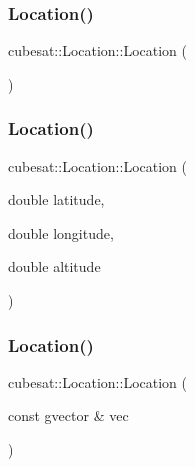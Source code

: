\subsubsection{\texorpdfstring{Location()}{Location()}\hspace{0.1cm}{\footnotesize\ttfamily [1/3]}}
{\footnotesize\ttfamily cubesat\+::\+Location\+::\+Location (\begin{DoxyParamCaption}{ }\end{DoxyParamCaption})\hspace{0.3cm}{\ttfamily [inline]}}

\mbox{\label{structcubesat_1_1Location_a5bb8201f3d6b276e19b4767fd9bfc7dd}} 
\subsubsection{\texorpdfstring{Location()}{Location()}\hspace{0.1cm}{\footnotesize\ttfamily [2/3]}}
{\footnotesize\ttfamily cubesat\+::\+Location\+::\+Location (\begin{DoxyParamCaption}\item[{double}]{latitude,  }\item[{double}]{longitude,  }\item[{double}]{altitude }\end{DoxyParamCaption})\hspace{0.3cm}{\ttfamily [inline]}}

\mbox{\label{structcubesat_1_1Location_ac6e05f08da64e8dad865013bcbc27223}} 
\subsubsection{\texorpdfstring{Location()}{Location()}\hspace{0.1cm}{\footnotesize\ttfamily [3/3]}}
{\footnotesize\ttfamily cubesat\+::\+Location\+::\+Location (\begin{DoxyParamCaption}\item[{const gvector \&}]{vec }\end{DoxyParamCaption})\hspace{0.3cm}{\ttfamily [inline]}}



